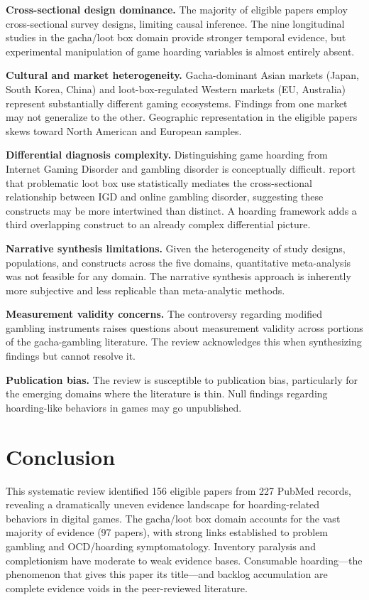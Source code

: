 \documentclass[12pt]{article}
\begin{document}
\textbf{Cross-sectional design dominance.} The majority of eligible papers employ cross-sectional survey designs, limiting causal inference. The nine longitudinal studies in the gacha/loot box domain provide stronger temporal evidence, but experimental manipulation of game hoarding variables is almost entirely absent.

\textbf{Cultural and market heterogeneity.} Gacha-dominant Asian markets (Japan, South Korea, China) and loot-box-regulated Western markets (EU, Australia) represent substantially different gaming ecosystems. Findings from one market may not generalize to the other. Geographic representation in the eligible papers skews toward North American and European samples.

\textbf{Differential diagnosis complexity.} Distinguishing game hoarding from Internet Gaming Disorder and gambling disorder is conceptually difficult. \citet{LopezGonzalez2024} report that problematic loot box use statistically mediates the cross-sectional relationship between IGD and online gambling disorder, suggesting these constructs may be more intertwined than distinct. A hoarding framework adds a third overlapping construct to an already complex differential picture.

\textbf{Narrative synthesis limitations.} Given the heterogeneity of study designs, populations, and constructs across the five domains, quantitative meta-analysis was not feasible for any domain. The narrative synthesis approach is inherently more subjective and less replicable than meta-analytic methods.

\textbf{Measurement validity concerns.} The \citet{Tang2022} controversy regarding modified gambling instruments raises questions about measurement validity across portions of the gacha-gambling literature. The review acknowledges this when synthesizing findings but cannot resolve it.

\textbf{Publication bias.} The review is susceptible to publication bias, particularly for the emerging domains where the literature is thin. Null findings regarding hoarding-like behaviors in games may go unpublished.

\section{Conclusion}

This systematic review identified 156 eligible papers from 227 PubMed records, revealing a dramatically uneven evidence landscape for hoarding-related behaviors in digital games. The gacha/loot box domain accounts for the vast majority of evidence (97 papers), with strong links established to problem gambling and OCD/hoarding symptomatology. Inventory paralysis and completionism have moderate to weak evidence bases. Consumable hoarding---the phenomenon that gives this paper its title---and backlog accumulation are complete evidence voids in the peer-reviewed literature.
\end{document}
